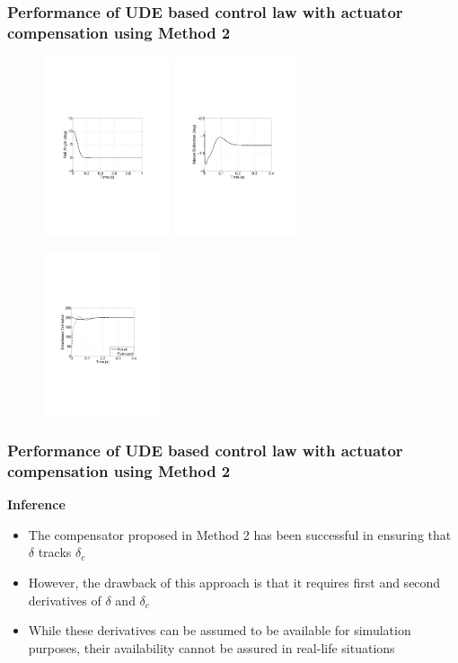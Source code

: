 \documentclass[table,10pt,red]{beamer}	%
\begin{document}
\begin{frame}
\frametitle{Performance of UDE based control law with actuator compensation using Method 2}
\begin{figure}
\includegraphics[width=3.7cm]{fig8a}
\includegraphics[width=3.7cm]{fig8b}
\begin{center}
\includegraphics[width=3.4cm]{fig8c}
\end{center}
\end{figure}
\end{frame}
\begin{frame}
\frametitle{Performance of UDE based control law with actuator compensation using Method 2}
\textbf{Inference}
\begin{itemize}
\item The compensator proposed in Method 2 has been successful in ensuring that $\delta$ tracks $\delta_c$
\item However, the drawback of this approach is that it requires first and second derivatives of $\delta$ and $\delta_c$
\item While these derivatives can be assumed to be available for simulation purposes, their availability cannot be assured in real-life situations
\end{itemize}
\end{frame}
\end{document}
